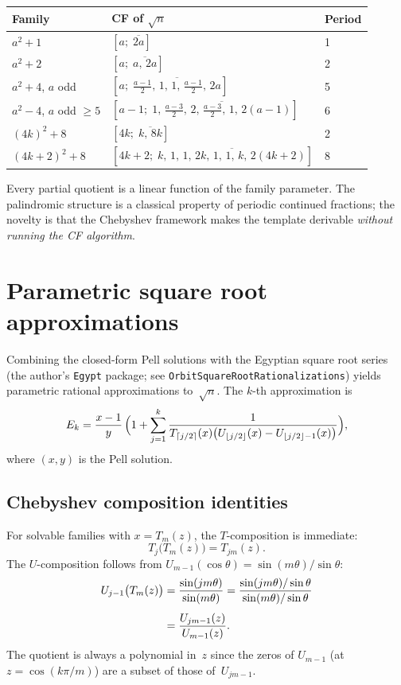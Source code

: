 \documentclass[11pt]{article}
\theoremstyle{definition}
\theoremstyle{remark}
\begin{document}
\begin{center}
\begin{tabular}{lll}
\toprule
Family & CF of $\sqrt{n}$ & Period \\
\midrule
$a^2 + 1$ & $[a;\; \overline{2a}]$ & 1 \\
$a^2 + 2$ & $[a;\; \overline{a,\, 2a}]$ & 2 \\
$a^2 + 4$, $a$ odd &
  $[a;\; \overline{\tfrac{a-1}{2},\, 1,\, 1,\, \tfrac{a-1}{2},\, 2a}]$ & 5 \\
$a^2 - 4$, $a$ odd $\ge 5$ &
  $[a{-}1;\; \overline{1,\, \tfrac{a-3}{2},\, 2,\, \tfrac{a-3}{2},\, 1,\, 2(a{-}1)}]$ & 6 \\
$(4k)^2 + 8$ &
  $[4k;\; \overline{k,\, 8k}]$ & 2 \\
$(4k{+}2)^2 + 8$ &
  $[4k{+}2;\; \overline{k,\, 1,\, 1,\, 2k,\, 1,\, 1,\, k,\, 2(4k{+}2)}]$ & 8 \\
\bottomrule
\end{tabular}
\end{center}
Every partial quotient is a linear function of the family parameter.
The palindromic structure is a classical property of periodic
continued fractions; the novelty is that the Chebyshev framework
makes the template derivable \emph{without running the CF algorithm}.

\section{Parametric square root approximations}\label{sec:sqrt}

Combining the closed-form Pell solutions with the Egyptian
square root series (the author's \texttt{Egypt} package;
see \texttt{Orbit\textasciigrave SquareRootRationalizations})
yields parametric rational approximations to~$\sqrt{n}$.
The $k$-th approximation is
\[
E_k = \frac{x-1}{y}\,\Bigl(1 + \sum_{j=1}^{k}
\frac{1}{T_{\lceil j/2\rceil}(x)\bigl(
U_{\lfloor j/2\rfloor}(x) - U_{\lfloor j/2\rfloor - 1}(x)\bigr)}\Bigr),
\]
where $(x, y)$ is the Pell solution.

\subsection{Chebyshev composition identities}

For solvable families with $x = T_m(z)$, the $T$-composition is immediate:
\begin{equation}\label{eq:Tcomp}
T_j\bigl(T_m(z)\bigr) = T_{jm}(z).
\end{equation}
The $U$-composition follows from $U_{m-1}(\cos\theta) = \sin(m\theta)/\sin\theta$:
\begin{align}
U_{j-1}\bigl(T_m(z)\bigr)
&= \frac{\sin(jm\theta)}{\sin(m\theta)}
= \frac{\sin(jm\theta)/\sin\theta}{\sin(m\theta)/\sin\theta}
\notag\\[4pt]
&= \frac{U_{jm-1}(z)}{U_{m-1}(z)}.
\label{eq:Ucomp}
\end{align}
The quotient is always a polynomial in~$z$ since the zeros of
$U_{m-1}$ (at $z = \cos(k\pi/m)$) are a subset of those
of~$U_{jm-1}$.
\end{document}
